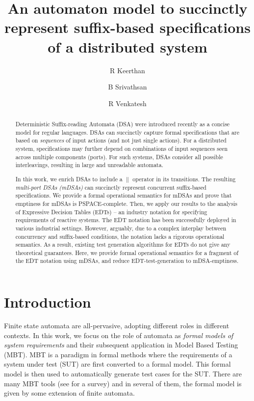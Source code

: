 \documentclass[runningheads,envcountsame]{llncs}
\title{An automaton model to succinctly represent suffix-based specifications of a distributed system}
\author{R Keerthan\inst{1,2} \and B Srivathsan\inst{2,3} \and
  R Venkatesh\inst{1}}
\institute{Tata Consultancy Services - Innovation Labs, Pune \\
   \email{keerthanr@tcs.com, r.venky@tcs.com} \and Chennai Mathematical Institute,
  India \\
  \email{sri@cmi.ac.in} \and CNRS, ReLaX,
  IRL 2000, Siruseri, India }
\begin{document}
  
  \maketitle

  \begin{abstract}
  Deterministic Suffix-reading Automata (DSA) were introduced recently as a  concise model for regular languages. 
  DSAs can succinctly capture formal specifications that are based on \emph{sequences} of input actions (and not just single actions). For a distributed system, specifications may further depend on combinations of input sequences seen across multiple components (ports). 
  For such systems, DSAs consider all possible interleavings, resulting in large and unreadable automata.

  In this work, we enrich DSAs to include a $\parallel$ operator in its transitions. The resulting \emph{multi-port DSAs (mDSAs)} can succinctly represent concurrent suffix-based specifications. We provide a formal operational semantics for mDSAs and prove that emptiness for mDSAs is PSPACE-complete. 
  Then, we apply our results to the analysis of Expressive Decision Tables (EDTs) -- an industry notation for specifying requirements of reactive systems. The EDT notation has been successfully deployed in various industrial settings. However, arguably, due to a complex interplay between concurrency and suffix-based conditions, the notation lacks a rigorous operational semantics. As a result, existing test generation algorithms for EDTs do not give any theoretical guarantees. Here, we provide formal operational semantics for a fragment of the EDT notation using mDSAs, and reduce EDT-test-generation to mDSA-emptiness.
  
  \end{abstract}
  
  \section{Introduction}


  Finite state automata are all-pervasive, adopting different roles in different contexts. In this work, we focus on the role of automata as \emph{formal models of system requirements} and their subsequent application in Model Based Testing (MBT). MBT is a paradigm in formal methods where the requirements of a system under test (SUT) are first converted to a formal model. This formal model is then used to automatically generate test cases for the SUT. There are many MBT tools (see \cite{10.1145/1353673.1353681,10.1002/stvr.456} for a survey) and in several of them, the formal model is given by some extension of finite automata. 
\end{document}

